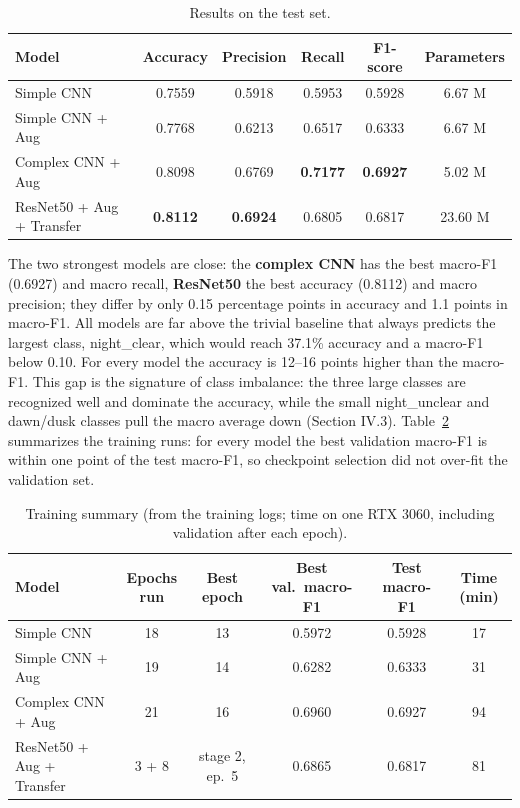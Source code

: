 \documentclass[12pt,letterpaper]{article}
\newcommand{\best}[1]{\textbf{#1}}
\begin{document}
\begin{table}[htbp]
\centering\small
\caption{Results on the test set.}
\label{tab:main}
\begin{tabular}{lccccc}
\toprule
Model & Accuracy & Precision & Recall & F1-score & Parameters \\
\midrule
Simple CNN                & 0.7559 & 0.5918 & 0.5953 & 0.5928 & 6.67 M \\
Simple CNN + Aug          & 0.7768 & 0.6213 & 0.6517 & 0.6333 & 6.67 M \\
Complex CNN + Aug         & 0.8098 & 0.6769 & \best{0.7177} & \best{0.6927} & 5.02 M \\
ResNet50 + Aug + Transfer & \best{0.8112} & \best{0.6924} & 0.6805 & 0.6817 & 23.60 M \\
\bottomrule
\end{tabular}
\end{table}

The two strongest models are close: the \textbf{complex CNN} has the best macro-F1 (0.6927) and macro recall,
\textbf{ResNet50} the best accuracy (0.8112) and macro precision; they differ by only 0.15 percentage points in
accuracy and 1.1 points in macro-F1. All models are far above the trivial baseline that always predicts the largest
class, night\_clear, which would reach 37.1\% accuracy and a macro-F1 below 0.10. For every model the accuracy is
12--16 points higher than the macro-F1. This gap is the signature of class imbalance: the three large classes are
recognized well and dominate the accuracy, while the small night\_unclear and dawn/dusk classes pull the macro average
down (Section IV.3). Table~\ref{tab:train} summarizes the training runs: for every model the best validation macro-F1
is within one point of the test macro-F1, so checkpoint selection did not over-fit the validation set.

\begin{table}[htbp]
\centering\small
\caption{Training summary (from the training logs; time on one RTX 3060, including validation after each epoch).}
\label{tab:train}
\begin{tabular}{lccccc}
\toprule
Model & Epochs run & Best epoch & Best val.\ macro-F1 & Test macro-F1 & Time (min) \\
\midrule
Simple CNN                & 18    & 13            & 0.5972 & 0.5928 & 17 \\
Simple CNN + Aug          & 19    & 14            & 0.6282 & 0.6333 & 31 \\
Complex CNN + Aug         & 21    & 16            & 0.6960 & 0.6927 & 94 \\
ResNet50 + Aug + Transfer & 3 + 8 & stage 2, ep.~5 & 0.6865 & 0.6817 & 81 \\
\bottomrule
\end{tabular}
\end{table}
\end{document}
